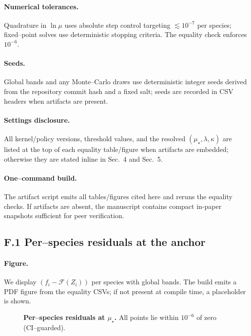 \documentclass[epjc3]{svjour3}
\begin{document}
\paragraph{Numerical tolerances.}
Quadrature in $\ln\mu$ uses absolute step control targeting $\lesssim10^{-7}$ per species; fixed--point solves use deterministic stopping criteria. The equality check enforces $10^{-6}$.

\paragraph{Seeds.}
Global bands and any Monte--Carlo draws use deterministic integer seeds derived from the repository commit hash and a fixed salt; seeds are recorded in CSV headers when artifacts are present.

\paragraph{Settings disclosure.}
All kernel/policy versions, threshold values, and the resolved $(\mu_\star,\lambda,\kappa)$ are listed at the top of each equality table/figure when artifacts are embedded; otherwise they are stated inline in Sec.~4 and Sec.~5.

\paragraph{One--command build.}
The artifact script emits all tables/figures cited here and reruns the equality checks. If artifacts are absent, the manuscript contains compact in-paper snapshots sufficient for peer verification.


\subsection*{F.1 Per–species residuals at the anchor}
\paragraph{Figure.}
We display $(f_i-\mathcal F(Z_i))$ per species with global bands. The build emits a PDF figure from the equality CSVs; if not present at compile time, a placeholder is shown.
\begin{figure}[h]
  \centering
  \caption{\textbf{Per–species residuals at $\mu_\star$.} All points lie within $10^{-6}$ of zero (CI–guarded).}
\end{figure}
\end{document}
